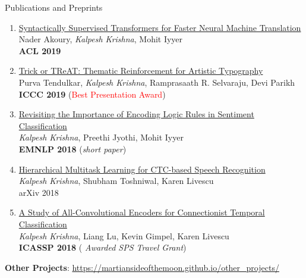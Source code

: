 \documentclass{resume} %
\begin{document}
\begin{rSection}{Publications and Preprints}
\begin{enumerate}[leftmargin=*]
\item \href{https://arxiv.org/abs/1906.02780}{Syntactically Supervised Transformers for Faster Neural Machine Translation} \\ Nader Akoury, \textit{Kalpesh Krishna}, Mohit Iyyer \\ \textbf{ACL 2019}
\item \href{https://arxiv.org/abs/1903.07820}{Trick or TReAT: Thematic Reinforcement for Artistic Typography} \\ Purva Tendulkar, \textit{Kalpesh Krishna}, Ramprasaath R. Selvaraju, Devi Parikh \\ \textbf{ICCC 2019} (\textcolor{red}{Best Presentation Award})
\item \href{https://arxiv.org/abs/1808.07733}{Revisiting the Importance of Encoding Logic Rules in Sentiment Classification} \\ \textit{Kalpesh Krishna}, Preethi Jyothi, Mohit Iyyer \\ \textbf{EMNLP 2018} (\textit{short paper})
\item \href{https://arxiv.org/abs/1807.06234}{Hierarchical Multitask Learning for CTC-based Speech Recognition} \\ \textit{Kalpesh Krishna}, Shubham Toshniwal, Karen Livescu \\
arXiv 2018
\item \href{https://arxiv.org/abs/1710.10398}{A Study of All-Convolutional Encoders for Connectionist Temporal Classification}\\ \textit{Kalpesh Krishna}, Liang Lu, Kevin Gimpel,  Karen Livescu\\ \textbf{ICASSP 2018} ({ \textit{Awarded SPS Travel Grant}})
%
\end{enumerate}

\textbf{Other Projects}: \url{https://martiansideofthemoon.github.io/other_projects/}
\end{rSection}

\vspace{0.1in}
\end{document}
